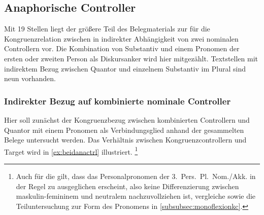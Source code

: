 
\subsection{Anaphorische Controller}

Mit 19 Stellen liegt der größere Teil des Belegmaterials zur \KC{} für die
Kongruenzrelation zwischen  in indirekter Abhängigkeit von zwei
nominalen Controllern vor. Die Kombination von Substantiv und einem Pronomen
der ersten oder zweiten Person als Diskurs\-anker wird hier mitgezählt.
Textstellen mit indirektem Bezug zwischen Quantor und einzelnem Substantiv im
Plural sind neun vorhanden.

\subsubsection{Indirekter Bezug auf kombinierte nominale Controller}
\label{subsubssec:iconomctrlpers}

Hier soll zunächst der Kongruenzbezug zwischen kombinierten Controllern und
Quantor mit einem Pronomen als Verbindungsglied anhand der gesammelten Belege
untersucht werden.
Das Verhältnis zwischen Kongruenzcontrollern und Target wird in
\cref{ex:beidanactrl} illustriert.%
%
	\footnote{Auch für die \KC{} gilt, dass das Personalpronomen der
		3.~Pers.\ Pl.\ Nom./Akk. in der Regel zu  ausgeglichen
		erscheint, also keine Differenzierung zwischen maskulin-femininem
		 und neutralem  nachzuvollziehen ist, vergleiche
		\textcites[213--214]{paul2007}[369, 390--397]{ksw2} sowie die
		Teiluntersuchung zur Form des Pronomens in
		\cref{subsubsec:monoflexionkc}.}

